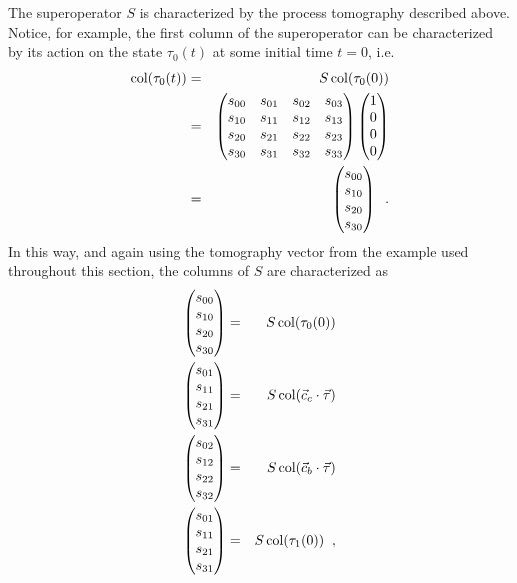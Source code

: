 The superoperator $S$ is characterized by the process tomography described above.  Notice, for example, the first column of the superoperator can be characterized by its action on the state $\tau_0(t)$ at some initial time $t=0$, i.e.\
\begin{eqnarray*}
\operatorname{col}(\tau_0(t)) &=& S \operatorname{col}(\tau_0(0))\\ 
&=& \begin{pmatrix}
s_{00} & s_{01} & s_{02} & s_{03}\\
s_{10} & s_{11} & s_{12} & s_{13}\\
s_{20} & s_{21} & s_{22} & s_{23}\\
s_{30} & s_{31} & s_{32} & s_{33}
\end{pmatrix} \begin{pmatrix}
1\\
0\\
0\\
0
\end{pmatrix}\\
&=& \begin{pmatrix}
s_{00}\\
s_{10}\\
s_{20}\\
s_{30}
\end{pmatrix}\;\;.
\end{eqnarray*}
In this way, and again using the tomography vector from the example used throughout this section, the columns of $S$ are characterized as
\begin{eqnarray*}
\begin{pmatrix}
s_{00}\\
s_{10}\\
s_{20}\\
s_{30}
\end{pmatrix} &=& S \operatorname{col}(\tau_0(0))\\
\begin{pmatrix}
s_{01}\\
s_{11}\\
s_{21}\\
s_{31}
\end{pmatrix} &=& S \operatorname{col}(\vec{c}_c\cdot\vec{\tau})\\
\begin{pmatrix}
s_{02}\\
s_{12}\\
s_{22}\\
s_{32}
\end{pmatrix} &=& S \operatorname{col}(\vec{c}_b\cdot\vec{\tau})\\
\begin{pmatrix}
s_{01}\\
s_{11}\\
s_{21}\\
s_{31}
\end{pmatrix} &=& S \operatorname{col}(\tau_1(0))\;\;,
\end{eqnarray*}
